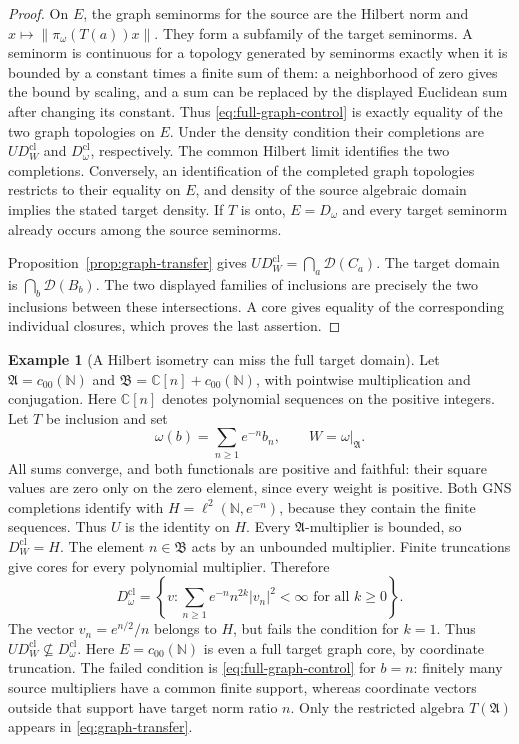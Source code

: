 \documentclass[11pt]{article}
\theoremstyle{definition}
\newtheorem{example}[theorem]{Example}
\theoremstyle{remark}
\numberwithin{equation}{section}
\newcommand{\C}{\mathbb C}
\begin{document}
\begin{proof}
On $E$, the graph seminorms for the source are the Hilbert norm and
$x\mapsto\|\pi_\omega(T(a))x\|$.  They form a subfamily of the target
seminorms.  A seminorm is continuous for a topology generated by seminorms
exactly when it is bounded by a constant times a finite sum of them:
a neighborhood of zero gives the bound by scaling, and a sum can be
replaced by the displayed Euclidean sum after changing its constant.
Thus \eqref{eq:full-graph-control} is exactly equality of the two
graph topologies on $E$.  Under the density condition their completions
are $UD_W^{\mathrm{cl}}$ and $D_\omega^{\mathrm{cl}}$, respectively.
The common Hilbert limit identifies the two completions.
Conversely, an identification of the completed graph topologies restricts
to their equality on $E$, and density of the source algebraic domain
implies the stated target density.
If $T$ is onto, $E=D_\omega$ and every target seminorm already occurs
among the source seminorms.

Proposition~\ref{prop:graph-transfer} gives
$UD_W^{\mathrm{cl}}=\bigcap_a\mathcal D(C_a)$.
The target domain is $\bigcap_b\mathcal D(B_b)$.
The two displayed families of inclusions are precisely the two inclusions
between these intersections.  A core gives equality of the corresponding
individual closures, which proves the last assertion.
\end{proof}

\begin{example}[A Hilbert isometry can miss the full target domain]
\label{ex:transfer-domain}
Let $\mathfrak A=c_{00}(\mathbb N)$ and
$\mathfrak B=\C[n]+c_{00}(\mathbb N)$, with pointwise multiplication
and conjugation.  Here $\C[n]$ denotes polynomial sequences on the
positive integers.  Let $T$ be inclusion and set
\[
 \omega(b)=\sum_{n\geq1}e^{-n}b_n,
 \qquad W=\omega|_{\mathfrak A}.
\]
All sums converge, and both functionals are positive and faithful: their
square values are zero only on the zero element, since every weight is positive.
Both GNS completions identify with
$H=\ell^2(\mathbb N,e^{-n})$, because they contain the finite sequences.
Thus $U$ is the identity on $H$.
Every $\mathfrak A$-multiplier is bounded, so $D_W^{\mathrm{cl}}=H$.
The element $n\in\mathfrak B$ acts by an unbounded multiplier.
Finite truncations give cores for every polynomial multiplier.  Therefore
\[
 D_\omega^{\mathrm{cl}}
 =\left\{v:\sum_{n\geq1}e^{-n}n^{2k}|v_n|^2<\infty
               \text{ for all }k\geq0\right\}.
\]
The vector $v_n=e^{n/2}/n$ belongs to $H$, but fails the condition for
$k=1$.  Thus $U D_W^{\mathrm{cl}}\nsubseteq D_\omega^{\mathrm{cl}}$.
Here $E=c_{00}(\mathbb N)$ is even a full target graph core, by
coordinate truncation.  The failed condition is
\eqref{eq:full-graph-control} for $b=n$: finitely many source multipliers
have a common finite support, whereas coordinate vectors outside that
support have target norm ratio $n$.  Only the restricted algebra
$T(\mathfrak A)$ appears in \eqref{eq:graph-transfer}.
\end{example}
\end{document}
